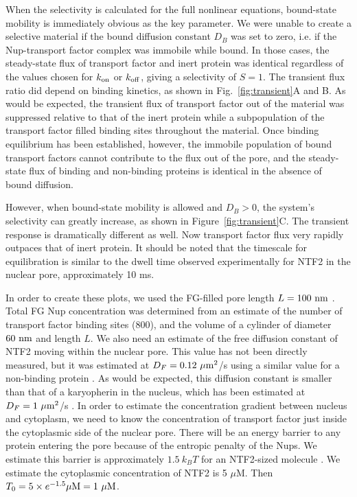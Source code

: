 When the selectivity is calculated for the full nonlinear equations, bound-state mobility is immediately obvious as the key parameter.  We were unable to create a selective material if the bound diffusion constant $D_B$ was set to zero, i.e. if the Nup-transport factor complex was immobile while bound.  In those cases, the steady-state flux of transport factor and inert protein was identical regardless of the values chosen for $k_{\rm on}$ or $k_{\rm off}$, giving a selectivity of $S = 1$.  The transient flux ratio did depend on binding kinetics, as shown in Fig.~\ref{fig:transient}A and B.  As would be expected, the transient flux of transport factor out of the material was suppressed relative to that of the inert protein while a subpopulation of the transport factor filled binding sites throughout the material.  Once binding equilibrium has been established, however, the immobile population of bound transport factors cannot contribute to the flux out of the pore, and the steady-state flux of binding and non-binding proteins is identical in the absence of bound diffusion.

However, when bound-state mobility is allowed and $D_B > 0$, the system's selectivity can greatly increase, as shown in Figure~\ref{fig:transient}C.  The transient response is dramatically different as well.  Now transport factor flux very rapidly outpaces that of inert protein.  It should be noted that the timescale for equilibration is similar to the dwell time observed experimentally for NTF2 in the nuclear pore, approximately 10 ms.

In order to create these plots, we used the FG-filled pore length $L = 100\ {\rm nm}$
\cite{frenkiel-krispin10, maimon12}.  Total FG Nup concentration was determined from an estimate of the number of transport factor binding sites (800), and the volume of a cylinder of diameter $60\ {\rm nm}$ and length $L$.  We also need an estimate of the free diffusion constant of NTF2 moving within the nuclear pore.  This value has not been directly measured, but it was estimated at $D_F = 0.12 \ \mu\tx{m}^2$/s using a similar value for a non-binding protein \cite{ribbeck01}.  As would be expected, this diffusion constant is smaller than that of a karyopherin in the nucleus, which has been estimated at $D_F =1 \ \mu\mathrm{m}^2$/s \cite{cardarelli10}.  In order to estimate the concentration gradient between nucleus and cytoplasm, we need to know the concentration of transport factor just inside the cytoplasmic side of the nuclear pore.  There will be an energy barrier to any protein entering the pore because of the entropic penalty of the Nups.  We estimate this barrier is approximately $1.5\ k_B T$ for an NTF2-sized molecule \cite{timney16}.  We estimate the cytoplasmic concentration of NTF2 is 5 $\mu$M.  Then $T_0= 5 \times e^{-1.5} \mu \mathrm{M} = 1 \mathrm{\ \mu M}$.  

